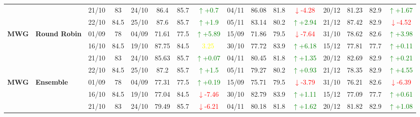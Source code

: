 \documentclass{ieeeaccess}
\begin{document}
{\begin{longtable}{llcc|cccc|cccc|cccc}
&
& 21/10 & 83 & 24/10 & 86.4 & 85.7 & \textcolor{green}{\(\uparrow\)+0.7} & 04/11 & 86.08 & 81.8 & \textcolor{red}{\(\downarrow\)-4.28} & 20/12 & 81.23 & 82.9 & \textcolor{green}{\(\uparrow\)+1.67} \\

&
& 22/10 & 84.5 & 25/10 & 87.6 & 85.7 & \textcolor{green}{\(\uparrow\)+1.9} & 05/11 & 83.14 & 80.2 & \textcolor{green}{\(\uparrow\)+2.94} & 21/12 & 87.42 & 82.9 & \textcolor{red}{\(\downarrow\)-4.52} \\
\midrule


\multirow{4}{*}{\textbf{MWG}} 
& \textbf{Round Robin}
& 01/09 & 78 & 04/09 & 71.61 & 77.5 & \textcolor{green}{\(\uparrow\)+5.89} & 15/09 & 71.86 & 79.5 & \textcolor{red}{\(\downarrow\)-7.64} & 31/10 & 78.62 & 82.6 & \textcolor{green}{\(\uparrow\)+3.98} \\

&
& 16/10 & 84.5 & 19/10 & 87.75 & 84.5 & \textcolor{yellow}{3.25} & 30/10 & 77.72 & 83.9 & \textcolor{green}{\(\uparrow\)+6.18} & 15/12 & 77.81 & 77.7 & \textcolor{green}{\(\uparrow\)+0.11} \\

&
& 21/10 & 83 & 24/10 & 85.63 & 85.7 & \textcolor{green}{\(\uparrow\)+0.07} & 04/11 & 80.45 & 81.8 & \textcolor{green}{\(\uparrow\)+1.35} & 20/12 & 82.69 & 82.9 & \textcolor{green}{\(\uparrow\)+0.21} \\

&
& 22/10 & 84.5 & 25/10 & 87.2 & 85.7 & \textcolor{green}{\(\uparrow\)+1.5} & 05/11 & 79.27 & 80.2 & \textcolor{green}{\(\uparrow\)+0.93} & 21/12 & 78.35 & 82.9 & \textcolor{green}{\(\uparrow\)+4.55} \\
\midrule




\multirow{4}{*}{\textbf{MWG}} 
& \textbf{Ensemble}
& 01/09 & 78 & 04/09 & 77.31 & 77.5 & \textcolor{green}{\(\uparrow\)+0.19} & 15/09 & 75.71 & 79.5 & \textcolor{red}{\(\downarrow\)-3.79} & 31/10 & 76.21 & 82.6 & \textcolor{red}{\(\downarrow\)-6.39} \\

&
& 16/10 & 84.5 & 19/10 & 77.04 & 84.5 & \textcolor{red}{\(\downarrow\)-7.46} & 30/10 & 82.79 & 83.9 & \textcolor{green}{\(\uparrow\)+1.11} & 15/12 & 77.09 & 77.7 & \textcolor{green}{\(\uparrow\)+0.61} \\

&
& 21/10 & 83 & 24/10 & 79.49 & 85.7 & \textcolor{red}{\(\downarrow\)-6.21} & 04/11 & 80.18 & 81.8 & \textcolor{green}{\(\uparrow\)+1.62} & 20/12 & 81.82 & 82.9 & \textcolor{green}{\(\uparrow\)+1.08} \\


\end{longtable}}
\end{document}
